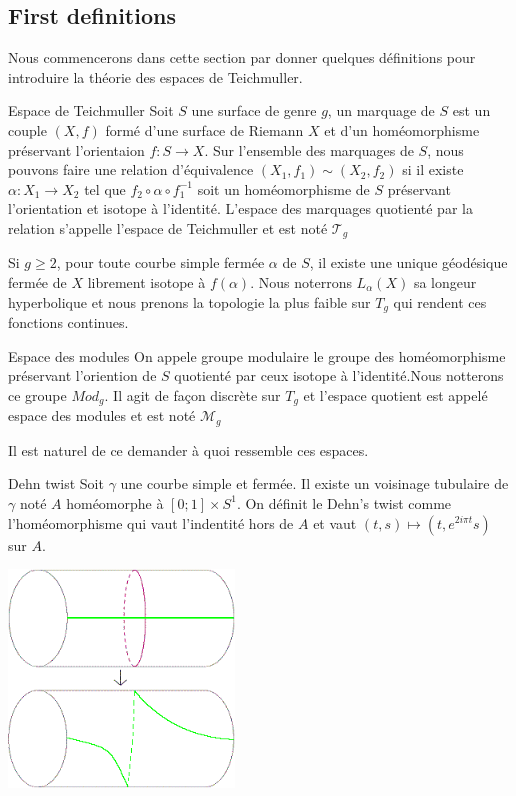 \subsection{First definitions}

Nous commencerons dans cette section par donner quelques définitions pour introduire la théorie des espaces de Teichmuller.

\begin{dfnt}{Espace de Teichmuller}
Soit $S$ une surface de genre $g$, un marquage de $S$ est un couple $(X,f)$ formé d'une surface de Riemann $X$ et d'un homéomorphisme préservant l'orientaion $f:S \to X$.
Sur l'ensemble des marquages de $S$, nous pouvons faire une relation d'équivalence $(X_1,f_1) \sim (X_2,f_2)$ si il existe $\alpha : X_1 \to X_2 $ tel que $f_2 \circ \alpha \circ f_1^{-1}$ soit un homéomorphisme de $S$ préservant l'orientation et isotope à l'identité.
L'espace des marquages quotienté par la relation s'appelle l'espace de Teichmuller et est noté $\mathcal{T}_g$
\end{dfnt}

\begin{rmq}
Si $g \geq 2$, pour toute courbe simple fermée $\alpha$ de $S$, il existe une unique géodésique fermée de $X$ librement isotope à $f(\alpha)$. Nous noterrons $L_{\alpha}(X)$ sa longeur hyperbolique et nous prenons la topologie la plus faible sur $T_g$ qui rendent ces fonctions continues.
\end{rmq}

\begin{dfnt}{Espace des modules}
On appele groupe modulaire le groupe des homéomorphisme préservant l'oriention de $S$ quotienté par ceux isotope à l'identité.Nous notterons ce groupe $Mod_g$.
Il agit de façon discrète sur $T_g$ et l'espace quotient est appelé espace des modules et est noté $\mathcal{M}_g$
\end{dfnt}

Il est naturel de ce demander à quoi ressemble ces espaces.

\begin{dfnt}{Dehn twist}
Soit $\gamma$ une courbe simple et fermée. Il existe un voisinage tubulaire de $\gamma$ noté $A$ homéomorphe à $[0;1] \times S^{1}$.
On définit le Dehn's twist comme l'homéomorphisme qui vaut l'indentité hors de $A$ et vaut $(t,s) \mapsto (t,e^{2i \pi t} s)$ sur $A$.
\end{dfnt}

\includegraphics[width=6cm]{Image/Dehn_twist.png}


